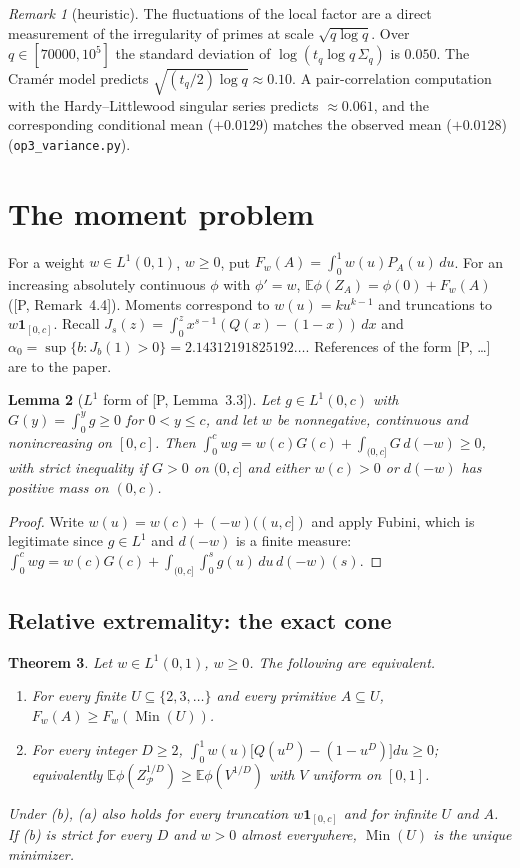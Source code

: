 \documentclass[11pt]{article}
\newtheorem{theorem}{Theorem}[section]
\newtheorem{lemma}[theorem]{Lemma}
\theoremstyle{remark}
\newtheorem{remark}[theorem]{Remark}
\newcommand{\Prm}{\mathcal{P}}
\newcommand{\E}{\mathbb{E}}
\newcommand{\Min}{\operatorname{Min}}
\begin{document}
\begin{remark}[heuristic]
The fluctuations of the local factor are a direct measurement of the irregularity of
primes at scale $\sqrt{q\log q}$. Over $q\in[70000,10^5]$ the standard deviation of
$\log(t_q\log q\,\Sigma_q)$ is $0.050$. The Cram\'er model predicts $\sqrt{(t_q/2)\log q}\approx0.10$. A
pair-correlation computation with the Hardy--Littlewood singular series predicts $\approx0.061$,
and the corresponding conditional mean ($+0.0129$) matches the observed mean ($+0.0128$)
(\texttt{op3\_variance.py}).
\end{remark}

\section{The moment problem}\label{sec:op2}

For a weight $w\in L^1(0,1)$, $w\ge0$, put $F_w(A)=\int_0^1w(u)P_A(u)\,du$. For an increasing
absolutely continuous $\phi$ with $\phi'=w$, $\E\phi(Z_A)=\phi(0)+F_w(A)$ ([P, Remark~4.4]).
Moments correspond to $w(u)=ku^{k-1}$ and truncations to $w\mathbf 1_{[0,c]}$. Recall
$J_s(z)=\int_0^zx^{s-1}(Q(x)-(1-x))\,dx$ and $\alpha_0=\sup\{b:J_b(1)>0\}=2.14312191825192\ldots$.
References of the form [P, \dots] are to the paper.

\begin{lemma}[$L^1$ form of {[P, Lemma~3.3]}]\label{lem:stieltjesL1}
Let $g\in L^1(0,c)$ with $G(y)=\int_0^yg\ge0$ for $0<y\le c$, and let $w$ be nonnegative,
continuous and nonincreasing on $[0,c]$. Then $\int_0^cwg=w(c)G(c)+\int_{(0,c]}G\,d(-w)\ge0$,
with strict inequality if $G>0$ on $(0,c]$ and either $w(c)>0$ or $d(-w)$ has positive mass
on $(0,c)$.
\end{lemma}

\begin{proof}
Write $w(u)=w(c)+(-w)((u,c])$ and apply Fubini, which is legitimate since $g\in L^1$ and
$d(-w)$ is a finite measure: $\int_0^cwg=w(c)G(c)+\int_{(0,c]}\int_0^sg(u)\,du\,d(-w)(s)$.
\end{proof}

\subsection{Relative extremality: the exact cone}

\begin{theorem}\label{thm:relative}
Let $w\in L^1(0,1)$, $w\ge0$. The following are equivalent.
\begin{enumerate}
\item[(a)] For every finite $U\subseteq\{2,3,\dots\}$ and every primitive $A\subseteq U$,
$F_w(A)\ge F_w(\Min(U))$.
\item[(b)] For every integer $D\ge2$,
$\int_0^1w(u)\bigl[Q(u^D)-(1-u^D)\bigr]du\ge0$; equivalently
$\E\phi(Z_\Prm^{1/D})\ge\E\phi(V^{1/D})$ with $V$ uniform on $[0,1]$.
\end{enumerate}
Under (b), (a) also holds for every truncation $w\mathbf 1_{[0,c]}$ and for infinite $U$
and $A$. If (b) is strict for every $D$ and $w>0$ almost everywhere, $\Min(U)$ is the unique
minimizer.
\end{theorem}
\end{document}
